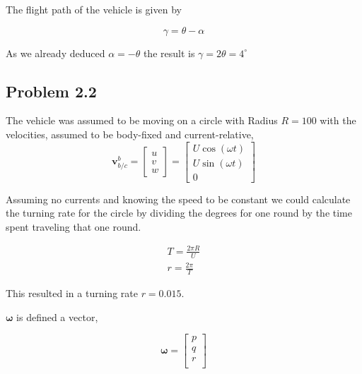 The flight path of the vehicle is given by 

\begin{equation}
    \gamma = \theta - \alpha
\end{equation}

As we already deduced $\alpha = -\theta$ the result is $\gamma = 2\theta = 4^\circ$

\subsection*{Problem 2.2}
The vehicle was assumed to be moving on a circle with Radius $R = 100$ with the velocities, assumed to be body-fixed and current-relative,
\begin{equation}
\label{eq:velocity}
    \mathbf{v}^b_{b/c} = 
	\begin{bmatrix}
		u \\
		v \\
		w
	\end{bmatrix}
	= 
	\begin{bmatrix}
		U \cos( \omega t)\\
		U \sin(\omega t)\\
		0	
	\end{bmatrix}
\end{equation}

Assuming no currents and knowing the speed to be constant we could calculate the turning rate for the circle by dividing the degrees for one round by the time spent traveling that one round.

\begin{subequations}
    \begin{align}
        T = \frac{2\pi R}{U} \\
        r = \frac{2\pi}{T}
    \end{align}
\end{subequations}

This resulted in a turning rate $r = 0.015$.

$\boldsymbol{\omega}$ is defined a vector, 

\begin{equation}
    \boldsymbol{\omega} =
    \begin{bmatrix}
        p \\
        q \\
        r \\
    \end{bmatrix}
\end{equation}

